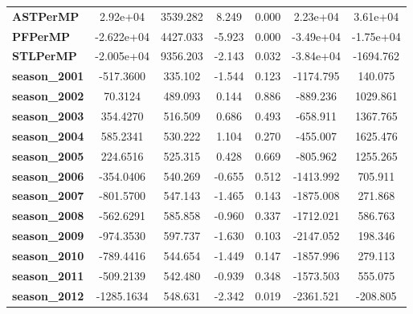 \begin{center}
\begin{tabular}{lcccccc}
\textbf{ASTPerMP}             &     2.92e+04  &     3539.282     &     8.249  &         0.000        &     2.23e+04    &     3.61e+04     \\
\textbf{PFPerMP}              &   -2.622e+04  &     4427.033     &    -5.923  &         0.000        &    -3.49e+04    &    -1.75e+04     \\
\textbf{STLPerMP}             &   -2.005e+04  &     9356.203     &    -2.143  &         0.032        &    -3.84e+04    &    -1694.762     \\
\textbf{season\_2001}         &    -517.3600  &      335.102     &    -1.544  &         0.123        &    -1174.795    &      140.075     \\
\textbf{season\_2002}         &      70.3124  &      489.093     &     0.144  &         0.886        &     -889.236    &     1029.861     \\
\textbf{season\_2003}         &     354.4270  &      516.509     &     0.686  &         0.493        &     -658.911    &     1367.765     \\
\textbf{season\_2004}         &     585.2341  &      530.222     &     1.104  &         0.270        &     -455.007    &     1625.476     \\
\textbf{season\_2005}         &     224.6516  &      525.315     &     0.428  &         0.669        &     -805.962    &     1255.265     \\
\textbf{season\_2006}         &    -354.0406  &      540.269     &    -0.655  &         0.512        &    -1413.992    &      705.911     \\
\textbf{season\_2007}         &    -801.5700  &      547.143     &    -1.465  &         0.143        &    -1875.008    &      271.868     \\
\textbf{season\_2008}         &    -562.6291  &      585.858     &    -0.960  &         0.337        &    -1712.021    &      586.763     \\
\textbf{season\_2009}         &    -974.3530  &      597.737     &    -1.630  &         0.103        &    -2147.052    &      198.346     \\
\textbf{season\_2010}         &    -789.4416  &      544.654     &    -1.449  &         0.147        &    -1857.996    &      279.113     \\
\textbf{season\_2011}         &    -509.2139  &      542.480     &    -0.939  &         0.348        &    -1573.503    &      555.075     \\
\textbf{season\_2012}         &   -1285.1634  &      548.631     &    -2.342  &         0.019        &    -2361.521    &     -208.805     \\

\end{tabular}
\end{center}
